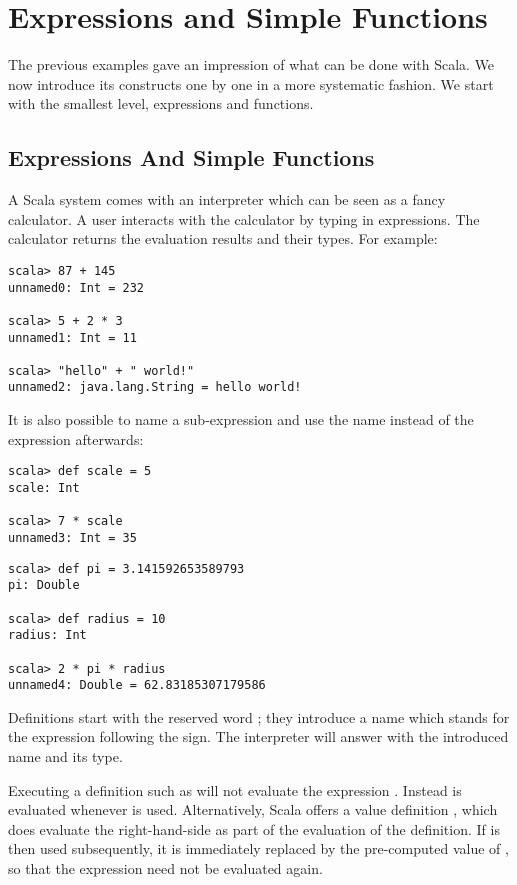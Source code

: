 \chapter{\label{chap:simple-funs}Expressions and Simple Functions}

The previous examples gave an impression of what can be done with
Scala.  We now introduce its constructs one by one in a more
systematic fashion. We start with the smallest level, expressions and
functions.

\section{Expressions And Simple Functions}

A Scala system comes with an interpreter which can be seen as a fancy
calculator. A user interacts with the calculator by typing in
expressions. The calculator returns the evaluation results and their
types. For example:

\begin{lstlisting}
scala> 87 + 145
unnamed0: Int = 232

scala> 5 + 2 * 3
unnamed1: Int = 11

scala> "hello" + " world!"
unnamed2: java.lang.String = hello world!
\end{lstlisting}
It is also possible to name a sub-expression and use the name instead
of the expression afterwards:
\begin{lstlisting}
scala> def scale = 5
scale: Int

scala> 7 * scale
unnamed3: Int = 35
\end{lstlisting}
\begin{lstlisting}
scala> def pi = 3.141592653589793
pi: Double

scala> def radius = 10
radius: Int

scala> 2 * pi * radius
unnamed4: Double = 62.83185307179586
\end{lstlisting}
Definitions start with the reserved word ; they introduce a
name which stands for the expression following the \code{=} sign.  The
interpreter will answer with the introduced name and its type.

Executing a definition such as  will not evaluate the
expression .  Instead  is evaluated whenever 
is used. Alternatively, Scala offers a value definition 
, which does evaluate the right-hand-side  as part of the
evaluation of the definition. If  is then used subsequently,
it is immediately replaced by the pre-computed value of
, so that the expression need not be evaluated again.
 

